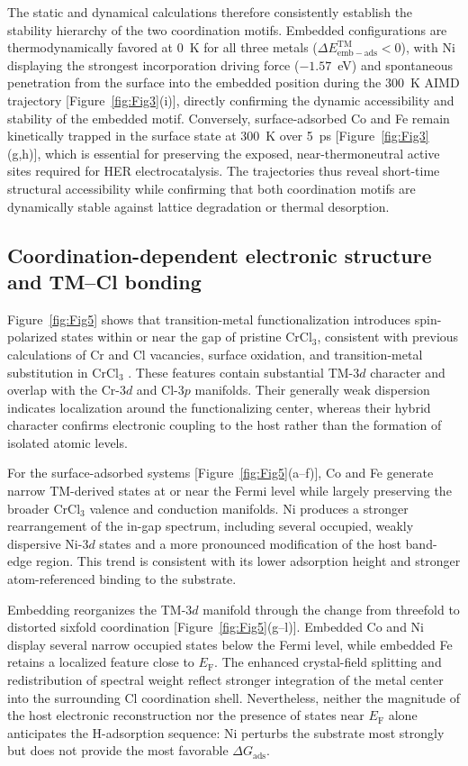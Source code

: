 \documentclass[journal=jacsat,manuscript=article]{achemso}
\begin{document}
The static and dynamical calculations therefore consistently establish the stability hierarchy of the two coordination motifs. Embedded configurations are thermodynamically favored at 0~K for all three metals ($\Delta E_{\mathrm{emb-ads}}^{\mathrm{TM}} < 0$), with Ni displaying the strongest incorporation driving force ($-1.57$~eV) and spontaneous penetration from the surface into the embedded position during the 300~K AIMD trajectory [Figure~\ref{fig:Fig3}(i)], directly confirming the dynamic accessibility and stability of the embedded motif. Conversely, surface-adsorbed Co and Fe remain kinetically trapped in the surface state at 300~K over 5~ps [Figure~\ref{fig:Fig3}(g,h)], which is essential for preserving the exposed, near-thermoneutral active sites required for HER electrocatalysis. The trajectories thus reveal short-time structural accessibility while confirming that both coordination motifs are dynamically stable against lattice degradation or thermal desorption.

\subsection{Coordination-dependent electronic structure and TM--Cl bonding}

\noindent Figure~\ref{fig:Fig5} shows that transition-metal functionalization introduces spin-polarized states within or near the gap of pristine CrCl$_3$, consistent with previous calculations of Cr and Cl vacancies, surface oxidation, and transition-metal substitution in CrCl$_3$ \cite{Gao2018,Mastrippolito2021,Wang2019,Safi2023}. These features contain substantial TM-$3d$ character and overlap with the Cr-$3d$ and Cl-$3p$ manifolds. Their generally weak dispersion indicates localization around the functionalizing center, whereas their hybrid character confirms electronic coupling to the host rather than the formation of isolated atomic levels.

For the surface-adsorbed systems [Figure~\ref{fig:Fig5}(a--f)], Co and Fe generate narrow TM-derived states at or near the Fermi level while largely preserving the broader CrCl$_3$ valence and conduction manifolds. Ni produces a stronger rearrangement of the in-gap spectrum, including several occupied, weakly dispersive Ni-$3d$ states and a more pronounced modification of the host band-edge region. This trend is consistent with its lower adsorption height and stronger atom-referenced binding to the substrate.

Embedding reorganizes the TM-$3d$ manifold through the change from threefold to distorted sixfold coordination [Figure~\ref{fig:Fig5}(g--l)]. Embedded Co and Ni display several narrow occupied states below the Fermi level, while embedded Fe retains a localized feature close to $E_{\mathrm F}$. The enhanced crystal-field splitting and redistribution of spectral weight reflect stronger integration of the metal center into the surrounding Cl coordination shell. Nevertheless, neither the magnitude of the host electronic reconstruction nor the presence of states near $E_{\mathrm F}$ alone anticipates the H-adsorption sequence: Ni perturbs the substrate most strongly but does not provide the most favorable $\Delta G_{\mathrm{ads}}$.
\end{document}
